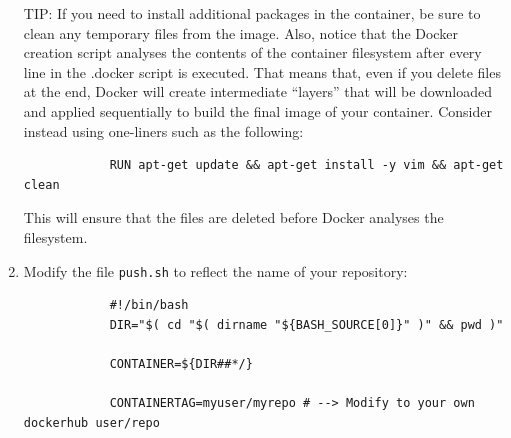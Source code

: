 \documentclass[a4paper,10pt]{article}
\newcommand{\VerbatimFont}{\footnotesize}
\newcommand{\identifier}[1]{{\texttt{\small{#1}}}}
\begin{document}
\begin{enumerate}
		TIP: If you need to install additional packages in the container, be sure to clean any temporary files from the image. Also, notice that the Docker creation script analyses the contents of the container filesystem after every line in the .docker script is executed. That means that, even if you delete files at the end, Docker will create intermediate ``layers'' that will be downloaded and applied sequentially to build the final image of your container. Consider instead using one-liners such as the following:
		{\VerbatimFont\begin{verbatim}
		    RUN apt-get update && apt-get install -y vim && apt-get clean
		\end{verbatim}}
		This will ensure that the files are deleted before Docker analyses the filesystem.
	\item Modify the file \identifier{push.sh} to reflect the name of your repository:
		{\VerbatimFont\begin{verbatim}
			#!/bin/bash
			DIR="$( cd "$( dirname "${BASH_SOURCE[0]}" )" && pwd )"
			
			CONTAINER=${DIR##*/}
			
			CONTAINERTAG=myuser/myrepo # --> Modify to your own dockerhub user/repo
			

\end{verbatim}}
\end{enumerate}
\end{document}
